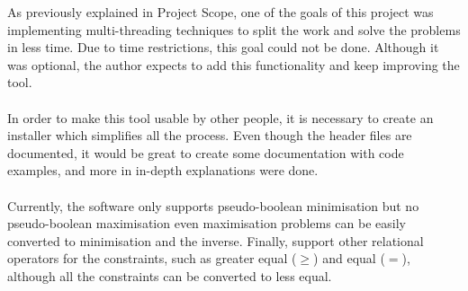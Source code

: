 


As previously explained in Project Scope, one of the goals of this project was implementing multi-threading techniques to split the work and solve the problems in less time. 
Due to time restrictions, this goal could not be done. Although it was optional, the author expects to add this functionality and keep improving the tool. \\\\
In order to make this tool usable by other people, it is necessary to create an installer which simplifies all the process.  Even though the header files are documented, it would be great to create some documentation with code examples, and more in in-depth explanations were done. \\\\
Currently, the software only supports pseudo-boolean minimisation but no pseudo-boolean maximisation even maximisation problems can be easily converted to minimisation and the inverse.  
Finally, support other relational operators for the constraints, such as greater equal ($\geq$) and equal ($=$), although all the constraints can be converted to less equal. 


